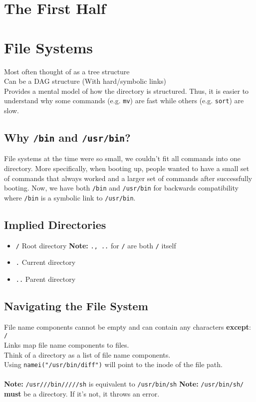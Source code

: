 \documentclass[13pt]{article}
\begin{document}
\tableofcontents
\newpage
{}
\section*{The First Half}
\section{File Systems}
Most often thought of as a tree structure \\
Can be a DAG structure (With hard/symbolic links) \\
Provides a mental model of how the directory is structured. Thus, it is easier to understand why some commands (e.g. \texttt{mv}) are fast while others (e.g. \texttt{sort}) are slow.

\subsection{Why \texttt{/bin} and \texttt{/usr/bin}?}
File systems at the time were so small, we couldn't fit all commands into one directory. More specifically, when booting up, people wanted to have a small set of commands that always worked and a larger set of commands after successfully booting. Now, we have both \texttt{/bin} and \texttt{/usr/bin} for backwards compatibility where \texttt{/bin} is a symbolic link to \texttt{/usr/bin}.

\subsection{Implied Directories}
\begin{itemize}[leftmargin = 0pt]
\item [] \texttt{/} Root directory
  \subitem \textbf{Note:} \texttt{., ..} for \texttt{/} are both \texttt{/} itself
\item [] \texttt{.} Current directory
\item [] \texttt{..} Parent directory
\end{itemize}

\subsection{Navigating the File System}
File name components cannot be empty and can contain any characters \textbf{except}: \texttt{/} \\
Links map file name components to files. \\
Think of a directory as a list of file name components. \\
Using \texttt{namei("/usr/bin/diff")} will point to the inode of the file path. \\ \\
\textbf{Note:} \texttt{/usr///bin/////sh} is equivalent to \texttt{/usr/bin/sh}
\textbf{Note:} \texttt{/usr/bin/sh/} \textbf{must} be a directory. If it's not, it throws an error.
\end{document}
